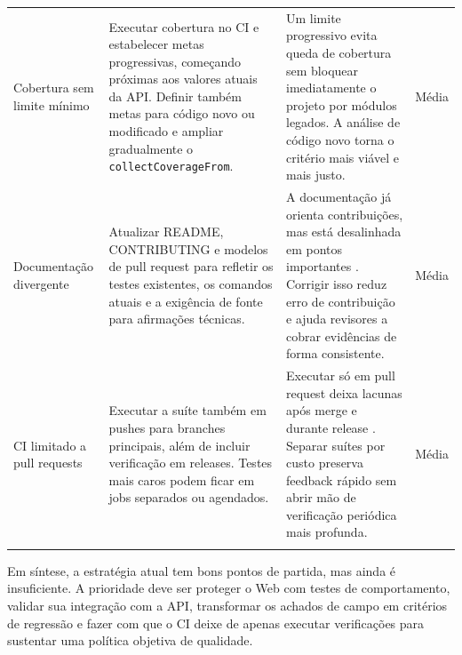 {\begin{longtable}{>{\raggedright\arraybackslash}p{2.4cm} >{\raggedright\arraybackslash}p{3.8cm} >{\raggedright\arraybackslash}p{4.5cm} >{\raggedright\arraybackslash}p{1.9cm}}
Cobertura sem limite mínimo
&
Executar cobertura no CI e estabelecer metas progressivas, começando próximas
aos valores atuais da API. Definir também metas para código novo ou modificado e
ampliar gradualmente o \texttt{collectCoverageFrom}.
&
Um limite progressivo evita queda de cobertura sem bloquear imediatamente o
projeto por módulos legados. A análise de código novo torna o critério mais
viável e mais justo.
&
Média
\\
\addlinespace

Documentação divergente
&
Atualizar README, CONTRIBUTING e modelos de pull request para refletir os testes
existentes, os comandos atuais e a exigência de fonte para afirmações técnicas.
&
A documentação já orienta contribuições, mas está desalinhada em pontos
importantes \cite{educado-repos}. Corrigir isso reduz erro de contribuição e
ajuda revisores a cobrar evidências de forma consistente.
&
Média
\\
\addlinespace

CI limitado a pull requests
&
Executar a suíte também em pushes para branches principais, além de incluir
verificação em releases. Testes mais caros podem ficar em jobs separados ou
agendados.
&
Executar só em pull request deixa lacunas após merge e durante release
\cite{educado-repos}. Separar suítes por custo preserva feedback rápido sem
abrir mão de verificação periódica mais profunda.
&
Média
\\
\addlinespace
\bottomrule
\end{longtable}
}

Em síntese, a estratégia atual tem bons pontos de partida, mas ainda é
insuficiente. A prioridade deve ser proteger o Web com testes de comportamento,
validar sua integração com a API, transformar os achados de campo em critérios de
regressão e fazer com que o CI deixe de apenas executar verificações para
sustentar uma política objetiva de qualidade.
